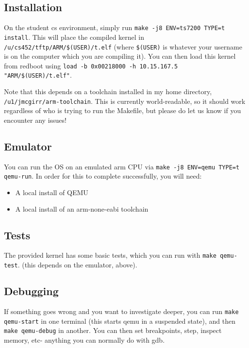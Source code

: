 \subsection{Installation}\label{installation}

On the student cs environment, simply run
\texttt{make -j8 ENV=ts7200 TYPE=t install}. This will place the
compiled kernel in \texttt{/u/cs452/tftp/ARM/\$(USER)/t.elf} (where
\texttt{\$(USER)} is whatever your username is on the computer which you
are compiling it). You can then load this kernel from redboot using
\texttt{load -b 0x00218000 -h 10.15.167.5 "ARM/\$(USER)/t.elf"}.

Note that this depends on a toolchain installed in my home directory,
\texttt{/u1/jmcgirr/arm-toolchain}. This is currently world-readable, so
it should work regardless of who is trying to run the Makefile, but
please do let us know if you encounter any issues!

\subsection{Emulator}\label{emulator}

You can run the OS on an emulated arm CPU via
\texttt{make -j8 ENV=qemu TYPE=t qemu-run}. In order for this to
complete successfully, you will need:

\begin{itemize}
\itemsep1pt\parskip0pt
\item
  A local install of QEMU
\item
  A local install of an arm-none-eabi toolchain
\end{itemize}

\subsection{Tests}\label{tests}

The provided kernel has some basic tests, which you can run with
\texttt{make qemu-test}. (this depends on the emulator, above).

\subsection{Debugging}\label{debugging}

If something goes wrong and you want to investigate deeper, you can run
\texttt{make qemu-start} in one terminal (this starts qemu in a
suspended state), and then \texttt{make qemu-debug} in another. You can
then set breakpoints, step, inspect memory, etc- anything you can
normally do with gdb.

